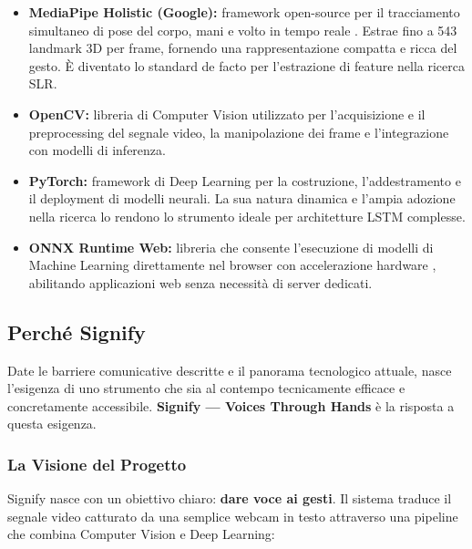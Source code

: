 \begin{itemize}
    \item \textbf{MediaPipe Holistic (Google):} framework open-source per il tracciamento simultaneo di pose del corpo, mani e volto in tempo reale \cite{mediapipe2020}. Estrae fino a 543 landmark 3D per frame, fornendo una rappresentazione compatta e ricca del gesto. È diventato lo standard de facto per l'estrazione di feature nella ricerca SLR.

    \item \textbf{OpenCV:} libreria di Computer Vision \cite{opencv2000} utilizzato per l'acquisizione e il preprocessing del segnale video, la manipolazione dei frame e l'integrazione con modelli di inferenza.

    \item \textbf{PyTorch:} framework di Deep Learning \cite{paszke2019pytorch} per la costruzione, l'addestramento e il deployment di modelli neurali. La sua natura dinamica e l'ampia adozione nella ricerca lo rendono lo strumento ideale per architetture LSTM complesse.

    \item \textbf{ONNX Runtime Web:} libreria che consente l'esecuzione di modelli di Machine Learning direttamente nel browser con accelerazione hardware \cite{onnx2024}, abilitando applicazioni web senza necessità di server dedicati.
\end{itemize}


\subsection{Perché Signify}

Date le barriere comunicative descritte e il panorama tecnologico attuale, nasce l'esigenza di uno strumento che sia al contempo tecnicamente efficace e concretamente accessibile. \textbf{Signify --- Voices Through Hands} è la risposta a questa esigenza.

\subsubsection{La Visione del Progetto}

Signify nasce con un obiettivo chiaro: \textbf{dare voce ai gesti}. Il sistema traduce il segnale video catturato da una semplice webcam in testo attraverso una pipeline che combina Computer Vision e Deep Learning:

